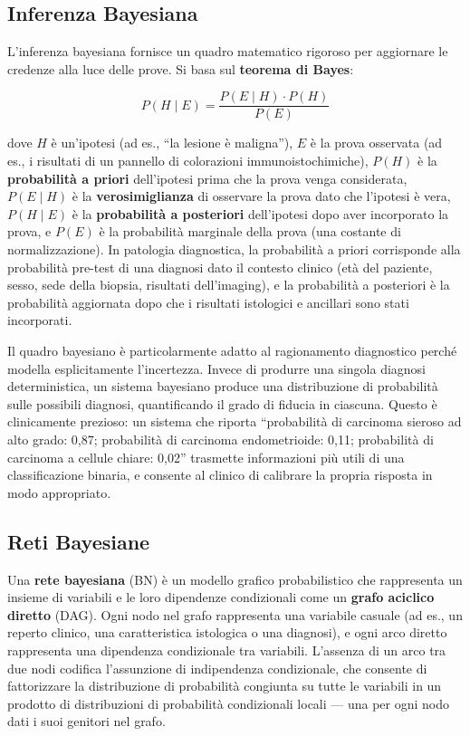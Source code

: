 \subsection{Inferenza Bayesiana}

L'inferenza bayesiana fornisce un quadro matematico rigoroso per aggiornare le credenze alla luce delle prove. Si basa sul \textbf{teorema di Bayes}:

\begin{equation}
    P(H \mid E) = \frac{P(E \mid H) \cdot P(H)}{P(E)}
\end{equation}

dove $H$ è un'ipotesi (ad es., ``la lesione è maligna''), $E$ è la prova osservata (ad es., i risultati di un pannello di colorazioni immunoistochimiche), $P(H)$ è la \textbf{probabilità a priori} dell'ipotesi prima che la prova venga considerata, $P(E \mid H)$ è la \textbf{verosimiglianza} di osservare la prova dato che l'ipotesi è vera, $P(H \mid E)$ è la \textbf{probabilità a posteriori} dell'ipotesi dopo aver incorporato la prova, e $P(E)$ è la probabilità marginale della prova (una costante di normalizzazione). In patologia diagnostica, la probabilità a priori corrisponde alla probabilità pre-test di una diagnosi dato il contesto clinico (età del paziente, sesso, sede della biopsia, risultati dell'imaging), e la probabilità a posteriori è la probabilità aggiornata dopo che i risultati istologici e ancillari sono stati incorporati.

Il quadro bayesiano è particolarmente adatto al ragionamento diagnostico perché modella esplicitamente l'incertezza. Invece di produrre una singola diagnosi deterministica, un sistema bayesiano produce una distribuzione di probabilità sulle possibili diagnosi, quantificando il grado di fiducia in ciascuna. Questo è clinicamente prezioso: un sistema che riporta ``probabilità di carcinoma sieroso ad alto grado: 0,87; probabilità di carcinoma endometrioide: 0,11; probabilità di carcinoma a cellule chiare: 0,02'' trasmette informazioni più utili di una classificazione binaria, e consente al clinico di calibrare la propria risposta in modo appropriato.

\subsection{Reti Bayesiane}

Una \textbf{rete bayesiana} (BN) è un modello grafico probabilistico che rappresenta un insieme di variabili e le loro dipendenze condizionali come un \textbf{grafo aciclico diretto} (DAG). Ogni nodo nel grafo rappresenta una variabile casuale (ad es., un reperto clinico, una caratteristica istologica o una diagnosi), e ogni arco diretto rappresenta una dipendenza condizionale tra variabili. L'assenza di un arco tra due nodi codifica l'assunzione di indipendenza condizionale, che consente di fattorizzare la distribuzione di probabilità congiunta su tutte le variabili in un prodotto di distribuzioni di probabilità condizionali locali — una per ogni nodo dati i suoi genitori nel grafo.

